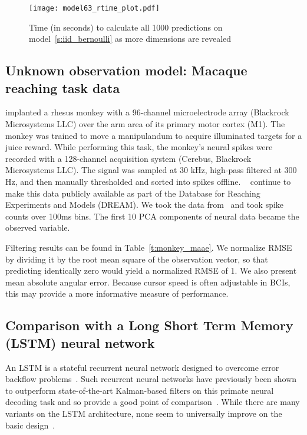 \begin{figure}[h!]
\centering
\texttt{[image: model63\_rtime\_plot.pdf]}
\caption{Time (in seconds) to calculate all 1000 predictions on model~\ref{s:iid_bernoulli} as more dimensions are revealed}
\label{fig:mdl43_rtime}
\end{figure}

\subsection{Unknown observation model: Macaque reaching task data} 

\textcite{Fli12} implanted a rhesus monkey with a 96-channel microelectrode array (Blackrock Microsystems LLC) over the arm area of its primary motor cortex (M1).  The monkey was trained to move a manipulandum to acquire illuminated targets for a juice reward.  While performing this task, the monkey's neural spikes were recorded with a 128-channel acquisition system (Cerebus, Blackrock Microsystems LLC).  The signal was sampled at 30 kHz, high-pass filtered at 300 Hz, and then manually thresholded and sorted into spikes offline. ~\textcite*{Wal13} continue to make this data publicly available as part of the Database for Reaching Experiments and Models (DREAM).  We took the data from~\textcite{Fli12} and took spike counts over 100ms bins.  The first 10 PCA components of neural data became the observed variable.

Filtering results can be found in Table~\ref{t:monkey_maae}.  We normalize RMSE by dividing it by the root mean square of the observation vector, so that predicting identically zero would yield a normalized RMSE of 1.  We also present mean absolute angular error.  Because cursor speed is often adjustable in BCIs, this may provide a more informative measure of performance.

\subsection{Comparison with a Long Short Term Memory (LSTM) neural network}  

An LSTM is a stateful recurrent neural network designed to overcome error backflow problems~\cite{Hoc97}.  Such recurrent neural networks have previously been shown to outperform state-of-the-art Kalman-based filters on this primate neural decoding task and so provide a good point of comparison~\cite{Sus12,Sus16}.  While there are many variants on the LSTM architecture, none seem to universally improve on the basic design~\cite{Joz15,Gre16}.


